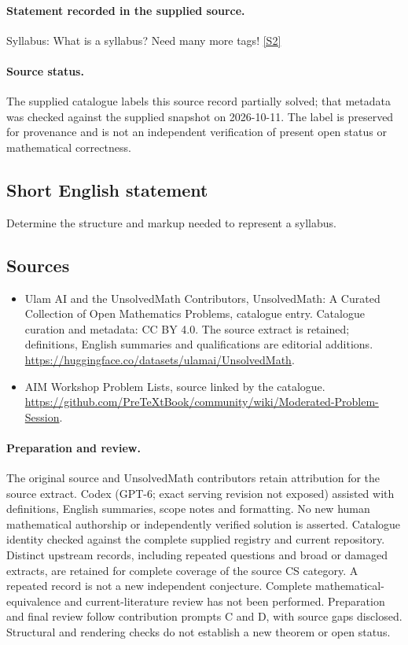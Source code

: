 \documentclass[11pt]{article}
\begin{document}
\paragraph{Statement recorded in the supplied source.}
Syllabus: What is a syllabus? Need many more tags! \href{https://github.com/PreTeXtBook/community/wiki/Moderated-Problem-Session}{[S2]}
\paragraph{Source status.}
The supplied catalogue labels this source record partially solved; that metadata was checked against the supplied snapshot on 2026-10-11. The label is preserved for provenance and is not an independent verification of present open status or mathematical correctness.
\subsection{Short English statement}
Determine the structure and markup needed to represent a syllabus.
\subsection{Sources}
\begin{itemize}
\item[S1] Ulam AI and the UnsolvedMath Contributors, UnsolvedMath: A Curated Collection of Open Mathematics Problems, catalogue entry. Catalogue curation and metadata: CC BY 4.0. The source extract is retained; definitions, English summaries and qualifications are editorial additions.
\url{https://huggingface.co/datasets/ulamai/UnsolvedMath}.
\item[S2] AIM Workshop Problem Lists, source linked by the catalogue.
\url{https://github.com/PreTeXtBook/community/wiki/Moderated-Problem-Session}.
\end{itemize}
\paragraph{Preparation and review.}
The original source and UnsolvedMath contributors retain attribution for the source extract. Codex (GPT-6; exact serving revision not exposed) assisted with definitions, English summaries, scope notes and formatting. No new human mathematical authorship or independently verified solution is asserted. Catalogue identity checked against the complete supplied registry and current repository. Distinct upstream records, including repeated questions and broad or damaged extracts, are retained for complete coverage of the source CS category. A repeated record is not a new independent conjecture. Complete mathematical-equivalence and current-literature review has not been performed. Preparation and final review follow contribution prompts C and D, with source gaps disclosed. Structural and rendering checks do not establish a new theorem or open status.
\label{end:statement}
\end{document}
